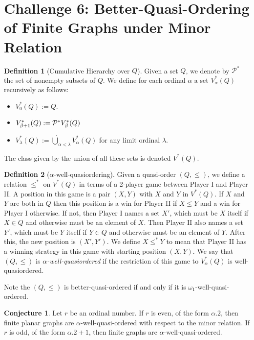 \documentclass[12pt]{article}
\numberwithin{equation}{section}
\theoremstyle{definition}
\newtheorem{definition}{Definition}
\newtheorem{conjecture}[theorem]{Conjecture}
\begin{document}
\section*{Challenge 6: Better-Quasi-Ordering of Finite Graphs under Minor Relation}

\begin{definition}[Cumulative Hierarchy over $Q$]
Given a set $Q$, we denote by $\mathcal P^*$ the set of nonempty subsets of $Q$. We define for each ordinal $\alpha$ a set $V^*_{\alpha}(Q)$ recursively as follows:
\begin{itemize}
\item $V^*_0(Q) := Q$.
\item $V^*_{\beta + 1}(Q) := {\cal{P}}^* V^*_{\beta}(Q)$
\item $V^*_{\lambda}(Q) := \dot \bigcup_{\alpha < \lambda} V^*_{\alpha}(Q)$ for any limit ordinal $\lambda$.
\end{itemize}

The class given by the union of all these sets is denoted $V^*(Q)$. 
\end{definition}

\begin{definition}[$\alpha$-well-quasiordering]
Given a quasi-order $(Q,\le)$, we define a relation $\le^*$ on $V^*(Q)$ in terms of a 2-player game between Player I and Player II. A position in this game is a pair $(X,Y)$ with $X$ and $Y$ in $V^*(Q)$. If $X$ and $Y$ are both in $Q$ then this position is a win for Player II if $X \le Y$ and a win for Player I otherwise. If not, then Player I names a set $X'$, which must be $X$ itself if $X \in Q$ and otherwise must be an element of $X$. Then Player II also names a set $Y'$, which must be $Y$ itself if $Y \in Q$ and otherwise must be an element of $Y$. After this, the new position is $(X', Y')$. We define $X \le^* Y$ to mean that Player II has a winning strategy in this game with starting position $(X,Y)$.
\newline
We say that $(Q, \le)$ is {\em $\alpha$-well-quasiordered} if the restriction of this game to $V^*_{\alpha}(Q)$ is well-quasiordered.
\end{definition}

Note the $(Q, \le)$ is better-quasi-ordered if and only if it is $\omega_1$-well-quasi-ordered.

\begin{conjecture}
Let $r$ be an ordinal number. If $r$ is even, of the form $\alpha . 2$, then finite planar graphs are $\alpha$-well-quasi-ordered with respect to the minor relation. If $r$ is odd, of the form $\alpha . 2 + 1$, then finite graphs are $\alpha$-well-quasi-ordered.
\end{conjecture}

\printbibliography
\end{document}
